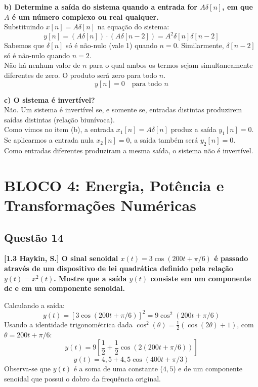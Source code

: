 \textbf{b) Determine a saída do sistema quando a entrada for \(A\delta[n]\), em que \(A\) é um número complexo ou real qualquer.}\\
Substituindo \(x[n] = A\delta[n]\) na equação do sistema:
\[y[n] = (A\delta[n]) \cdot (A\delta[n - 2]) = A^2 \delta[n]\delta[n - 2]\]
Sabemos que \(\delta[n]\) só é não-nulo (vale 1) quando \(n = 0\). Similarmente, \(\delta[n-2]\) só é não-nulo quando \(n = 2\).\\
Não há nenhum valor de \(n\) para o qual ambos os termos sejam simultaneamente diferentes de zero. O produto será zero para todo \(n\).
\[y[n] = 0 \quad \text{para todo } n\]

\textbf{c) O sistema é invertível?}\\
Não. Um sistema é invertível se, e somente se, entradas distintas produzirem saídas distintas (relação biunívoca).\\
Como vimos no item (b), a entrada \(x_1[n] = A\delta[n]\) produz a saída \(y_1[n] = 0\).\\
Se aplicarmos a entrada nula \(x_2[n] = 0\), a saída também será \(y_2[n] = 0\).\\
Como entradas diferentes produziram a mesma saída, o sistema não é invertível.

\section{BLOCO 4: Energia, Potência e Transformações Numéricas}\label{bloco-4-energia-potuxeancia-e-transformauxe7uxf5es-numuxe9ricas}

\subsection{Questão 14}\label{questuxe3o-14}

\textbf{{[}1.3 Haykin, S.{]} O sinal senoidal \(x(t) = 3 \cos(200t + \pi/6)\) é passado através de um dispositivo de lei quadrática definido pela relação \(y(t) = x^2(t)\). Mostre que a saída \(y(t)\) consiste em um componente dc e em um componente senoidal.}

Calculando a saída:
\[y(t) = [3 \cos(200t + \pi/6)]^2 = 9 \cos^2(200t + \pi/6)\]
Usando a identidade trigonométrica dada \(\cos^2(\theta) = \frac{1}{2}(\cos(2\theta) + 1)\), com \(\theta = 200t + \pi/6\):
\[y(t) = 9 \left[ \frac{1}{2} + \frac{1}{2}\cos(2(200t + \pi/6)) \right]\]
\[y(t) = 4,5 + 4,5 \cos(400t + \pi/3)\]
Observa-se que \(y(t)\) é a soma de uma constante (\(4,5\)) e de um componente senoidal que possui o dobro da frequência original.

